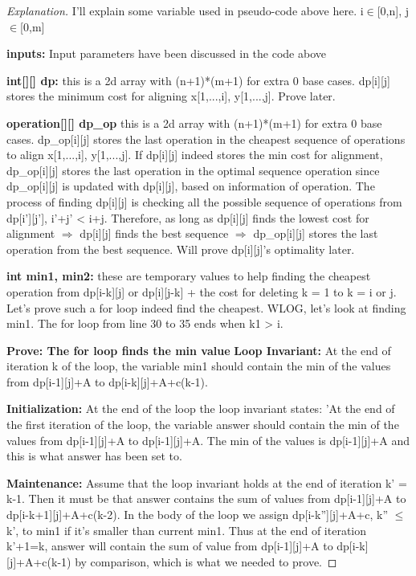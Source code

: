 \documentclass[openany]{article}
\begin{document}
\begin{proof}[Explanation]{}
		\renewcommand{\qedsymbol}{} %
        I'll explain some variable used in pseudo-code above here. i$\in$[0,n], j$\in$[0,m]

        \textbf{inputs:} Input parameters have been discussed in the code above
        
        \textbf{int[][] dp:} this is a 2d array with (n+1)*(m+1) for extra 0 base cases. dp[i][j] stores the minimum cost for aligning x[1,...,i], y[1,...,j].  Prove later.
        
        \textbf{operation[][] dp\_op} this is a 2d array with (n+1)*(m+1) for extra 0 base cases. dp\_op[i][j] stores the last operation in the cheapest sequence of operations to align x[1,...,i], y[1,...,j]. If dp[i][j] indeed stores the min cost for alignment, dp\_op[i][j] stores the last operation in the optimal sequence operation since dp\_op[i][j] is updated with dp[i][j], based on information of operation. The process of finding dp[i][j] is checking all the possible sequence of operations from dp[i'][j'], i'+j' < i+j. Therefore, as long as dp[i][j] finds the lowest cost for alignment $\Rightarrow$ dp[i][j] finds the best sequence $\Rightarrow$ dp\_op[i][j] stores the last operation from the best sequence. Will prove dp[i][j]'s optimality later.
        
        \textbf{int min1, min2:} these are temporary values to help finding the cheapest operation from dp[i-k][j] or dp[i][j-k] + the cost for deleting k = 1 to k = i or j. Let's prove such a for loop indeed find the cheapest. WLOG, let's look at finding min1. The for loop from line 30 to 35 ends when k1 > i.
        
        \textbf{Prove: The for loop finds the min value}
                \textbf{Loop Invariant:} At the end of iteration  k  of the loop, the variable min1 should contain the min of the values from dp[i-1][j]+A to dp[i-k][j]+A+c(k-1).
        
        \qquad \textbf{Initialization:} At the end of the loop the loop invariant states: 'At the end of the first iteration of the loop, the variable answer should contain the min of the values from dp[i-1][j]+A to dp[i-1][j]+A. The min of the values is dp[i-1][j]+A and this is what answer has been set to.
        
        \qquad \textbf{Maintenance:} Assume that the loop invariant holds at the end of iteration k' = k-1. Then it must be that answer contains the sum of values from dp[i-1][j]+A to dp[i-k+1][j]+A+c(k-2). In the body of the loop we assign dp[i-k''][j]+A+c, k'' $\leq$ k', to min1 if it's smaller than current min1. Thus at the end of iteration  k'+1=k, answer will contain the sum of value from dp[i-1][j]+A to dp[i-k][j]+A+c(k-1) by comparison, which is what we needed to prove.
        

\end{proof}
\end{document}
